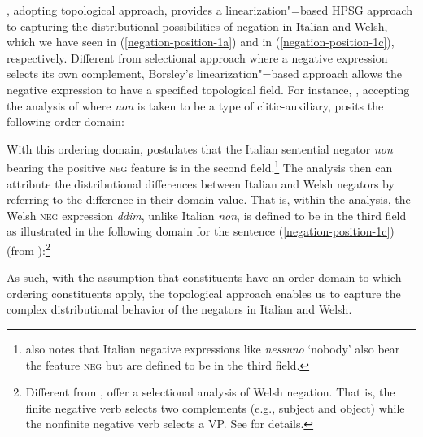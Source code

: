 \documentclass[output=paper
                ,modfonts
                ,nonflat
	        ,collection
	        ,collectionchapter
	        ,collectiontoclongg
 	        ,biblatex
                ,babelshorthands
                ,newtxmath
                ,draftmode
                ,colorlinks, citecolor=brown
]{./langsci/langscibook}
\begin{document}
{\begin{exe}
\begin{xlist}
\citet{Borsley:06}, adopting  topological approach,
 provides a linearization"=based HPSG approach to capturing the distributional possibilities of negation in Italian and Welsh, which we have seen
 in (\ref{negation-position-1a}) and in (\ref{negation-position-1c}), respectively.
%
%
  Different from  selectional
  approach where a negative expression selects its own complement,
  Borsley's linearization"=based approach allows the negative expression to
   have a specified topological field.
For instance, \citet{Borsley:06}, accepting the analysis of \citet{Kim:00}
where \textit{non} is taken to be a type of clitic-auxiliary, posits the following
order domain:


\ea
{}
\z
%
With this ordering domain, \citet{Borsley:06} postulates
that the Italian sentential negator \emph{non} bearing the positive \textsc{neg} feature is in the second field.\footnote{
\citet{Borsley:06} also notes that Italian negative expressions like \emph{nessuno} `nobody' also bear the feature \textsc{neg}
but are defined to be in the third field.}
The analysis then can attribute the distributional differences between Italian and Welsh negators
by referring to the difference in their domain value. That is,
within the analysis, the Welsh \textsc{neg} expression \emph{ddim}, unlike Italian \emph{non},
is defined to be in the third field as illustrated in the following domain for the sentence (\ref{negation-position-1c}) (from
\citealt{Borsley:06}):\footnote{Different from \citet{Borsley:06}, \citet{BJ:00} offer  a selectional analysis of Welsh negation.
That is, the finite negative verb selects
two complements (e.g., subject and object) while
the nonfinite negative verb selects a VP. See \citet{BJ:00} for details.}

\ea
{}
\z
As such,  with the assumption that
constituents have an order domain to which ordering constituents
apply, the topological approach enables us to capture the complex distributional
behavior of the negators in Italian and Welsh.
%


\end{xlist}
\end{exe}}
\end{document}
